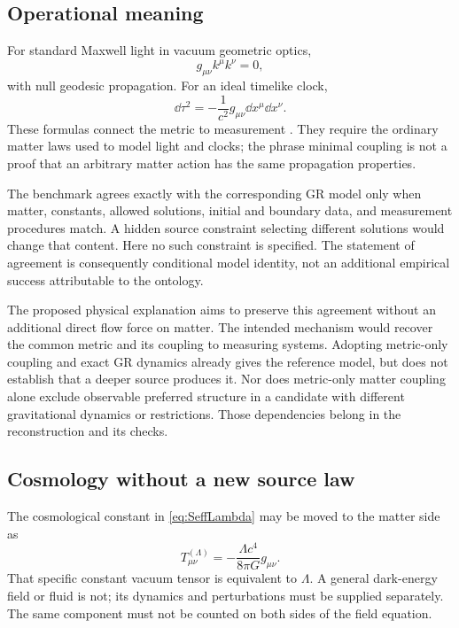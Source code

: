 \documentclass[11pt]{article}
\begin{document}
\subsection{Operational meaning}
For standard Maxwell light in vacuum geometric optics,
\begin{equation}
g_{\mu\nu}k^\mu k^\nu=0,
\label{eq:null}
\end{equation}
with null geodesic propagation. For an ideal timelike clock,
\begin{equation}
\dd\tau^2=-\frac1{c^2}g_{\mu\nu}\dd x^\mu\dd x^\nu.
\label{eq:tau}
\end{equation}
These formulas connect the metric to measurement \parencite{Carroll1997}. They require the ordinary matter laws used to model light and clocks; the phrase minimal coupling is not a proof that an arbitrary matter action has the same propagation properties.

The benchmark agrees exactly with the corresponding GR model only when matter, constants, allowed solutions, initial and boundary data, and measurement procedures match. A hidden source constraint selecting different solutions would change that content. Here no such constraint is specified. The statement of agreement is consequently conditional model identity, not an additional empirical success attributable to the ontology.

The proposed physical explanation aims to preserve this agreement without an additional direct flow force on matter. The intended mechanism would recover the common metric and its coupling to measuring systems. Adopting metric-only coupling and exact GR dynamics already gives the reference model, but does not establish that a deeper source produces it. Nor does metric-only matter coupling alone exclude observable preferred structure in a candidate with different gravitational dynamics or restrictions. Those dependencies belong in the reconstruction and its checks.

\subsection{Cosmology without a new source law}
The cosmological constant in \eqref{eq:SeffLambda} may be moved to the matter side as
\begin{equation}
T^{(\Lambda)}_{\mu\nu}=-\frac{\Lambda c^4}{8\pi G}g_{\mu\nu}.
\end{equation}
That specific constant vacuum tensor is equivalent to $\Lambda$. A general dark-energy field or fluid is not; its dynamics and perturbations must be supplied separately. The same component must not be counted on both sides of the field equation.
\end{document}
